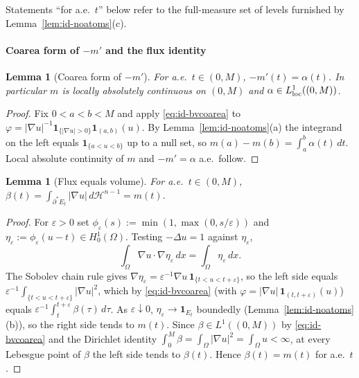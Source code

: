 \documentclass[11pt]{amsart}
\newtheorem{lemma}[theorem]{Lemma}
\theoremstyle{definition}
\newcommand{\Om}{\Omega}
\newcommand{\eps}{\varepsilon}
\newcommand{\Hn}{\mathcal H^{n-1}}
\begin{document}
\noindent
Statements ``for a.e.\ \(t\)'' below refer to the full-measure set of levels
furnished by Lemma~\ref{lem:id-noatoms}(c).

\paragraph*{Coarea form of \texorpdfstring{\(-m'\)}{-m'} and the flux identity}

\begin{lemma}[Coarea form of \(-m'\)]\label{lem:id-coarea}
For a.e.\ \(t\in(0,M)\), \(-m'(t)=\alpha(t)\).  In particular \(m\) is locally
absolutely continuous on \((0,M)\) and \(\alpha\in L^1_{\rm loc}((0,M))\).
\end{lemma}

\begin{proof}
Fix \(0<a<b<M\) and apply \eqref{eq:id-bvcoarea} to
\(\varphi=|\nabla u|^{-1}\mathbf 1_{\{|\nabla u|>0\}}\mathbf 1_{(a,b)}(u)\).
By Lemma~\ref{lem:id-noatoms}(a) the integrand on the left equals
\(\mathbf 1_{\{a<u<b\}}\) up to a null set, so
\(m(a)-m(b)=\int_a^b\alpha(t)\,dt\).  Local absolute continuity of \(m\) and
\(-m'=\alpha\) a.e.\ follow.
\end{proof}

\begin{lemma}[Flux equals volume]\label{lem:id-flux}
For a.e.\ \(t\in(0,M)\), \(\beta(t)=\int_{\partial^*E_t}|\nabla u|\,d\Hn=m(t)\).
\end{lemma}

\begin{proof}
For \(\eps>0\) set \(\phi_\eps(s):=\min(1,\max(0,s/\eps))\) and
\(\eta_\eps:=\phi_\eps(u-t)\in H^1_0(\Om)\).  Testing \(-\Delta u=1\) against
\(\eta_\eps\),
\[
   \int_\Om\nabla u\cdot\nabla\eta_\eps\,dx=\int_\Om\eta_\eps\,dx .
\]
The Sobolev chain rule \cite[Thm.~3.99]{AFP2000} gives
\(\nabla\eta_\eps=\eps^{-1}\nabla u\,\mathbf 1_{\{t<u<t+\eps\}}\), so the left
side equals \(\eps^{-1}\int_{\{t<u<t+\eps\}}|\nabla u|^2\), which by
\eqref{eq:id-bvcoarea} (with \(\varphi=|\nabla u|\,\mathbf 1_{(t,t+\eps)}(u)\))
equals \(\eps^{-1}\int_t^{t+\eps}\beta(\tau)\,d\tau\).  As \(\eps\downarrow0\),
\(\eta_\eps\to\mathbf 1_{E_t}\) boundedly (Lemma~\ref{lem:id-noatoms}(b)), so the
right side tends to \(m(t)\).  Since \(\beta\in L^1((0,M))\) by
\eqref{eq:id-bvcoarea} and the Dirichlet identity
\(\int_0^M\beta=\int_\Om|\nabla u|^2=\int_\Om u<\infty\), at every Lebesgue
point of \(\beta\) the left side tends to \(\beta(t)\).  Hence
\(\beta(t)=m(t)\) for a.e.\ \(t\).
\end{proof}
\end{document}
